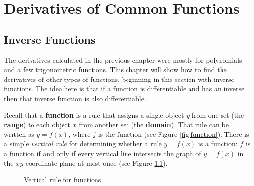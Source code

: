 \chapter{Derivatives of Common Functions}
\section{Inverse Functions}
The derivatives calculated in the previous chapter were mostly for polynomials
and a few trigonometric functions. This chapter will show how to find the
derivatives of other types of functions, beginning in this section with inverse
functions. The idea here is that if a function is differentiable and has
an inverse then that inverse function is also differentiable.

\piccaption[]{\label{fig:function}}
Recall that a \textbf{function} is a rule that assigns a single
object $y$ from one set (the \textbf{range}) to each object $x$
from another set (the \textbf{domain}). That rule can be written
as $y = f(x)$, where $f$ is the function (see Figure \ref{fig:function}). There
is a simple \emph{vertical rule} for determining whether a rule $y=f(x)$ is a
function: $f$ is a function if and only if every vertical line intersects the
graph of $y=f(x)$ in the $xy$-coordinate plane at most once (see
Figure \ref{fig:verticalrule}).

\begin{figure}[h]
 \centering
 \qquad\qquad
 \vspace{-2mm}
 \caption[]{\quad Vertical rule for functions}
 \label{fig:verticalrule}
\end{figure}

